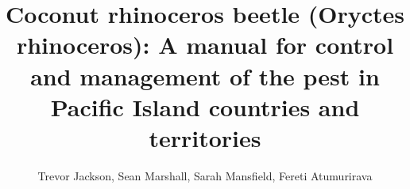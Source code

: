 \documentclass[twocolumn,letterpaper]{scrartcl}
\begin{document}
	
\title{Coconut rhinoceros beetle (Oryctes rhinoceros): A manual for control and management of the pest in Pacific Island countries and territories}
\author{Trevor Jackson, Sean Marshall, Sarah Mansfield, Fereti Atumurirava}
\maketitle

\tableofcontents{}

%
%
%
%
%
%
%
%
%
%
%
%
%
%
%
% 
%
% 
%
% 
%
% 
%
% 
%
% 
%
% 
%
% 
%
% 
%
%
%
%
%
%
%
%
\end{document}
